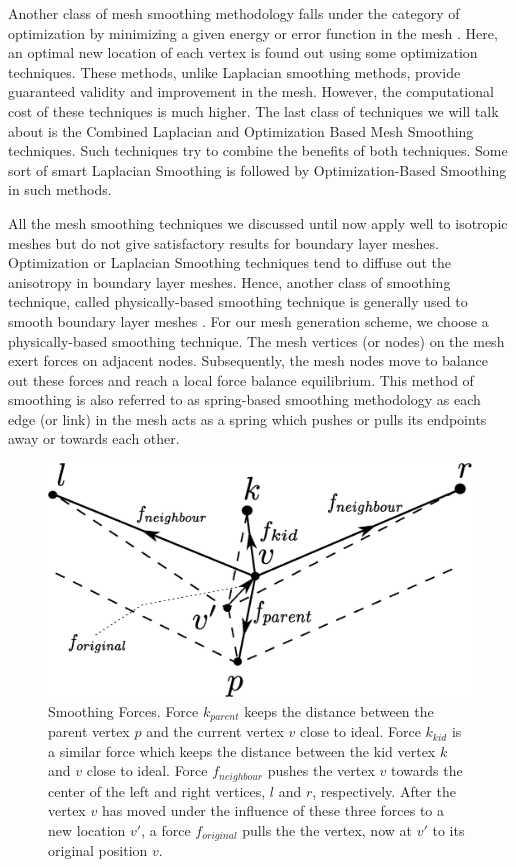 Another class of mesh smoothing methodology falls under the category of optimization by minimizing a given energy or error function in the mesh \cite{freitag1997tetrahedral, zhou2000angle, chen2004mesh, parthasarathy1991constrained, shephard1991automatic}. Here, an optimal new location of each vertex is found out using some optimization techniques. These methods, unlike Laplacian smoothing methods, provide guaranteed validity and improvement in the mesh. However, the computational cost of these techniques is much higher. The last class of techniques we will talk about is the Combined Laplacian and Optimization Based Mesh Smoothing techniques\cite{freitag1997combining, canann1998approach}. Such techniques try to combine the benefits of both techniques. Some sort of smart Laplacian Smoothing is followed by Optimization-Based Smoothing in such methods.

All the mesh smoothing techniques we discussed until now apply well to isotropic meshes but do not give satisfactory results for boundary layer meshes. Optimization or Laplacian Smoothing techniques tend to diffuse out the anisotropy in boundary layer meshes. Hence, another class of smoothing technique, called physically-based smoothing technique is generally used to smooth boundary layer meshes \cite{numerow2017mixed, liu2016automatic, xu2006angle, lin2014vertex}. For our mesh generation scheme, we choose a physically-based smoothing technique. The mesh vertices (or nodes) on the mesh exert forces on adjacent nodes. Subsequently, the mesh nodes move to balance out these forces and reach a local force balance equilibrium. This method of smoothing is also referred to as spring-based smoothing methodology as each edge (or link) in the mesh acts as a spring which pushes or pulls its endpoints away or towards each other.

\begin{figure}
	\centering
	\includegraphics[width=0.7\linewidth]{img/m2/smoothing/smoothing.eps}
	\caption[Smoothing force components on a vertex.]{Smoothing Forces. Force $k_{parent}$ keeps the distance between the parent vertex $p$ and the current vertex $v$ close to ideal. Force $k_{kid}$ is a similar force which keeps the distance between the kid vertex $k$ and $v$ close to ideal. Force $f_{neighbour}$ pushes the vertex $v$ towards the center of the left and right vertices, $l$ and $r$, respectively. After the vertex $v$ has moved under the influence of these three forces to a new location $v'$, a force $f_{original}$ pulls the the vertex, now at $v'$ to its original position $v$.}
	\label{smoothingForces}
\end{figure}

